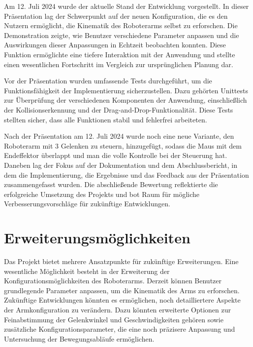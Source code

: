 \documentclass[12pt]{article}
\begin{document}
        Am 12. Juli 2024 wurde der aktuelle Stand der Entwicklung vorgestellt. In dieser Präsentation lag der
        Schwerpunkt auf der neuen Konfiguration, die es den Nutzern ermöglicht, die Kinematik des Roboterarms
        selbst zu erforschen. Die Demonstration zeigte, wie Benutzer verschiedene Parameter anpassen und die
        Auswirkungen dieser Anpassungen in Echtzeit beobachten konnten. Diese Funktion ermöglichte eine tiefere
        Interaktion mit der Anwendung und stellte einen wesentlichen Fortschritt im Vergleich zur ursprünglichen
        Planung dar.

        Vor der Präsentation wurden umfassende Tests durchgeführt, um die Funktionsfähigkeit der Implementierung
        sicherzustellen. Dazu gehörten Unittests zur Überprüfung der verschiedenen Komponenten der Anwendung,
        einschließlich der Kollisionserkennung und der Drag-and-Drop-Funktionalität. Diese Tests stellten sicher,
        dass alle Funktionen stabil und fehlerfrei arbeiteten.

        Nach der Präsentation am 12. Juli 2024 wurde noch eine neue Variante, den Roboterarm mit 3 Gelenken zu
        steuern, hinzugefügt, sodass die Maus mit dem Endeffektor überlappt und man die volle Kontrolle bei der
        Steuerung hat. Daneben lag der Fokus auf der Dokumentation und dem Abschlussbericht, in dem die
        Implementierung, die Ergebnisse und das Feedback aus der Präsentation zusammengefasst wurden. Die
        abschließende Bewertung reflektierte die erfolgreiche Umsetzung des Projekts und bot Raum für mögliche
        Verbesserungsvorschläge für zukünftige Entwicklungen.

    \section{Erweiterungsmöglichkeiten}
        Das Projekt bietet mehrere Ansatzpunkte für zukünftige Erweiterungen. Eine wesentliche Möglichkeit besteht
        in der Erweiterung der Konfigurationsmöglichkeiten des Roboterarms. Derzeit können Benutzer grundlegende
        Parameter anpassen, um die Kinematik des Arms zu erforschen. Zukünftige Entwicklungen könnten es ermöglichen,
        noch detailliertere Aspekte der Armkonfiguration zu verändern. Dazu könnten erweiterte Optionen zur
        Feinabstimmung der Gelenkwinkel und Geschwindigkeiten gehören sowie zusätzliche Konfigurationsparameter,
        die eine noch präzisere Anpassung und Untersuchung der Bewegungsabläufe ermöglichen.
\end{document}
